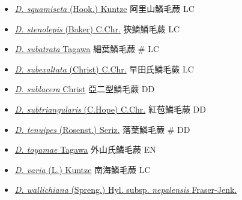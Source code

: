 \begin{itemize}
\begin{itemize}
        \item[] \href{http://www.theplantlist.org/tpl1.1/search?q=Dryopteris+squamiseta}{\textit{D. squamiseta} (Hook.) Kuntze}   阿里山鱗毛蕨   LC
        \item[] \href{http://www.theplantlist.org/tpl1.1/search?q=Dryopteris+stenolepis}{\textit{D. stenolepis} (Baker) C.Chr.}   狹鱗鱗毛蕨   LC
        \item[] \href{http://www.theplantlist.org/tpl1.1/search?q=Dryopteris+subatrata}{\textit{D. subatrata} Tagawa}   細葉鱗毛蕨  \# LC
        \item[] \href{http://www.theplantlist.org/tpl1.1/search?q=Dryopteris+subexaltata}{\textit{D. subexaltata} (Christ) C.Chr.}   早田氏鱗毛蕨   LC
        \item[] \href{http://www.theplantlist.org/tpl1.1/search?q=Dryopteris+sublacera}{\textit{D. sublacera} Christ}   亞二型鱗毛蕨   DD
        \item[] \href{http://www.theplantlist.org/tpl1.1/search?q=Dryopteris+subtriangularis}{\textit{D. subtriangularis} (C.Hope) C.Chr.}   紅苞鱗毛蕨   DD
        \item[] \href{http://www.theplantlist.org/tpl1.1/search?q=Dryopteris+tenuipes}{\textit{D. tenuipes} (Rosenst.) Seriz.}   落葉鱗毛蕨  \# DD
        \item[] \href{http://www.theplantlist.org/tpl1.1/search?q=Dryopteris+toyamae}{\textit{D. toyamae} Tagawa}   外山氏鱗毛蕨   EN
        \item[] \href{http://www.theplantlist.org/tpl1.1/search?q=Dryopteris+varia}{\textit{D. varia} (L.) Kuntze}   南海鱗毛蕨   LC
        \item[] \href{http://www.theplantlist.org/tpl1.1/search?q=Dryopteris+wallichiana+subsp.+nepalensis}{\textit{D. wallichiana} (Spreng.) Hyl. subsp. \textit{nepalensis} Fraser-Jenk.}  

\end{itemize}
\end{itemize}
